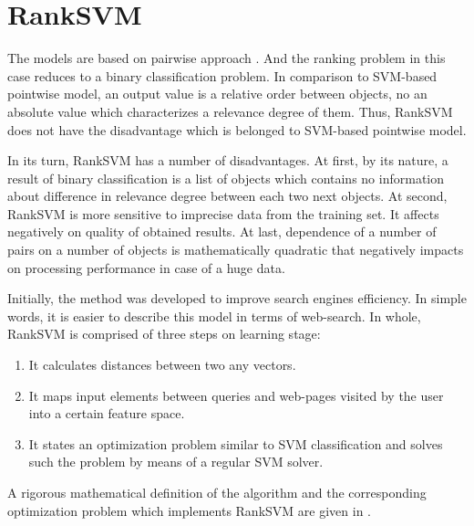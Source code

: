 \documentclass[12pt,a4paper,oneside]{article}
\begin{document}

\section{RankSVM}
\label{sec:ranksvm}

\par
The models are based on pairwise approach . 
And the ranking problem in this case reduces to a binary classification problem. 
In comparison to SVM-based pointwise model, an output value is a relative order between objects, no an absolute value which characterizes a relevance degree of them. 
Thus, RankSVM does not have the disadvantage which is belonged to SVM-based pointwise model.

\par
In its turn, RankSVM has a number of disadvantages. 
At first, by its nature, a result of binary classification is a list of objects which contains no information about difference in relevance degree between each two next objects. 
At second, RankSVM is more sensitive to imprecise data from the training set. 
It affects negatively on quality of obtained results. 
At last, dependence of a number of pairs on a number of objects is mathematically quadratic that negatively impacts on processing performance in case of a huge data.

\par
Initially, the method was developed to improve search engines efficiency. 
In simple words, it is easier to describe this model in terms of web-search. 
In whole, RankSVM is comprised of three steps on learning stage:

\begin{enumerate}
	\item It calculates distances between two any vectors.
	\item It maps input elements between queries and web-pages visited by the user into a certain feature space. 
	\item It states an optimization problem similar to SVM classification and solves such the problem by means of a regular SVM solver.
\end{enumerate}

\par
A rigorous mathematical definition of the algorithm and the corresponding optimization problem which implements RankSVM are given in . 
\end{document}
